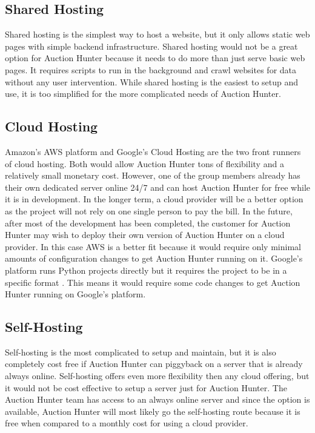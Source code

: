 \documentclass[onecolumn, draftclsnofoot,10pt, compsoc]{IEEEtran}
\begin{document}
\subsection{Shared Hosting}
Shared hosting is the simplest way to host a website, but it only allows static web pages with simple backend infrastructure. Shared hosting would not be a great option for Auction Hunter because it needs to do more than just serve basic web pages. It requires scripts to run in the background and crawl websites for data without any user intervention. While shared hosting is the easiest to setup and use, it is too simplified for the more complicated needs of Auction Hunter. 

\subsection{Cloud Hosting}
Amazon's AWS platform and Google’s Cloud Hosting are the two front runners of cloud hosting. Both would allow Auction Hunter tons of flexibility and a relatively small monetary cost. However, one of the group members already has their own dedicated server online 24/7 and can host Auction Hunter for free while it is in development. In the longer term, a cloud provider will be a better option as the project will not rely on one single person to pay the bill. In the future, after most of the development has been completed, the customer for Auction Hunter may wish to deploy their own version of Auction Hunter on a cloud provider. In this case AWS is a better fit because it would require only minimal amounts of configuration changes to get Auction Hunter running on it. Google's platform runs Python projects directly but it requires the project to be in a specific format \cite{gcp}. This means it would require some code changes to get Auction Hunter running on Google's platform. 

\subsection{Self-Hosting}
Self-hosting is the most complicated to setup and maintain, but it is also completely cost free if Auction Hunter can piggyback on a server that is already always online. Self-hosting offers even more flexibility then any cloud offering, but it would not be cost effective to setup a server just for Auction Hunter. The Auction Hunter team has access to an always online server and since the option is available, Auction Hunter will most likely go the self-hosting route because it is free when compared to a monthly cost for using a cloud provider.
\end{document}
